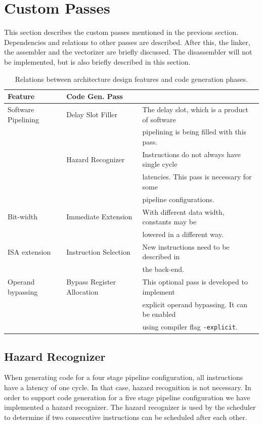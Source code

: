 \section{Custom Passes}
This section describes the custom passes mentioned in the previous section. Dependencies and relations to other passes are described. After this, the linker, the assembler and the vectorizer are briefly discussed. The disassembler will not be implemented, but is also briefly described in this section.

\begin{table}[t!]
\caption{Relations between architecture design features and code generation phases.}
\begin{center}
\begin{tabular}{@{}l l l@{}}
\toprule
\textbf{Feature} & \textbf{Code Gen. Pass} \\ \hline
Software Pipelining 	& Delay Slot Filler 	& The delay slot, which is a product of software\\
				&				& pipelining is being filled with this pass.\\
			 	& Hazard Recognizer & Instructions do not always have single cycle\\
				&				 & latencies. This pass is necessary for some\\
				&				& pipeline configurations. \\
Bit-width 			& Immediate Extension & With different data width, constants may be\\
				&				    & lowered in a different way. \\
ISA extension		& Instruction Selection & New instructions need to be described in\\
				&					& the back-end. \\
Operand bypassing 	& Bypass Register Allocation & This optional pass is developed to implement\\
				&					& explicit operand bypassing. It can be enabled\\
				&					& using compiler flag \texttt{-explicit}. \\
\bottomrule
\end{tabular}
\end{center}
\label{table:rel_feature_pass}
\end{table}%

\subsection{Hazard Recognizer}\label{sec:hazard_recogn}
When generating code for a four stage pipeline configuration, all instructions have a latency of one cycle. In that case, hazard recognition is not necessary.
In order to support code generation for a five stage pipeline configuration we have implemented a hazard recognizer. The hazard recognizer is used by the scheduler to determine if two consecutive instructions can be scheduled after each other. 

